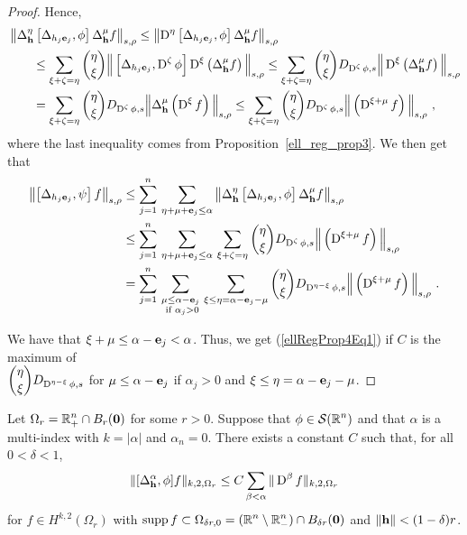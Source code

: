 \begin{proof}
Hence,
\begin{align*}
&\left\| \Delta^{\eta}_{\mathbf{h}} \left[
\Delta_{h_j \mathbf{e}_j}, \phi\right] \Delta^{\mu}_{\mathbf{h}} f \right\|_{s,\rho}
\leq \left\| \operatorname{D}^\eta \left[ \Delta_{h_j \mathbf{e}_j}, \phi\right]
\Delta^{\mu}_{\mathbf{h}} f\right\|_{s,\rho} \\
&\qquad \leq \sum_{\xi+\zeta = \eta} \binom{\eta}{\xi}
\Big\| \left[ \Delta_{h_j\mathbf{e}_j} , \operatorname{D}^\zeta \phi \right] \operatorname{D}^\xi
\left(\Delta^\mu_{\mathbf{h}} f\right) \Big\|_{s,\rho}
\leq \sum_{\xi+\zeta = \eta} \binom{\eta}{\xi}
D_{\operatorname{D}^\zeta \phi,s}
\Big\| \operatorname{D}^\xi \left(\Delta^\mu_{\mathbf{h}} f\right) \Big\|_{s,\rho} \\
&\qquad =\sum_{\xi+\zeta = \eta} \binom{\eta}{\xi} D_{\operatorname{D}^\zeta \phi,s}
\Big\| \Delta^\mu_{\mathbf{h}} \left(\operatorname{D}^\xi f\right) \Big\|_{s,\rho}
\leq \sum_{\xi+\zeta = \eta} \binom{\eta}{\xi}
D_{\operatorname{D}^\zeta \phi,s} \Big\| \left(\operatorname{D}^{\xi+\mu} f\right) \Big\|_{s,\rho} \ ,
\end{align*}
where the last inequality comes from Proposition~\ref{ell_reg_prop3}.
We then get that
\begin{align*}
\left\| \left[ \Delta_{h_j\mathbf{e}_j} ,\psi \right] f \right\|_{s,\rho}
&\leq \sum_{j=1}^n \,
\sum_{\eta+\mu+\mathbf{e}_j \leq \alpha} \left\| \Delta^{\eta}_{\mathbf{h}} \left[
\Delta_{h_j \mathbf{e}_j}, \phi\right] \Delta^{\mu}_{\mathbf{h}} f \right\|_{s,\rho} \\
&\leq \sum_{j=1}^n \,
\sum_{\eta+\mu+\mathbf{e}_j \leq \alpha} \, \sum_{\xi+\zeta = \eta} \binom{\eta}{\xi}
D_{\operatorname{D}^\zeta \phi,s} \Big\| \left(\operatorname{D}^{\xi+\mu} f\right) \Big\|_{s,\rho} \\
&= \sum_{j=1}^n \, \sum_{\substack{\mu \leq \alpha - \mathbf{e}_j \\
\text{ if } \alpha_j >0}} \, \sum_{\xi \leq \eta = \alpha - \mathbf{e}_j - \mu}
\binom{\eta}{\xi} D_{\operatorname{D}^{\eta- \xi} \phi,s}
\Big\| \left(\operatorname{D}^{\xi+\mu} f\right) \Big\|_{s,\rho} \ .
\end{align*}

We have that $\xi + \mu \leq \alpha - \mathbf{e}_j < \alpha$.  Thus, we
get (\ref{ellRegProp4Eq1}) if $C$ is the maximum of\\
$\displaystyle \binom{\eta}{\xi} D_{\operatorname{D}^{\eta - \xi} \phi,s}$ for
$\mu \leq \alpha - \mathbf{e}_j$ if $\alpha_j >0$ and
$\xi \leq \eta = \alpha - \mathbf{e}_j - \mu$.
\end{proof}

\begin{cor} \label{ell_reg_cor2}
Let $\displaystyle \Omega_r = \mathbb{R}^n_+ \cap B_r(\mathbf{0})$ for some $r>0$.
Suppose that $\displaystyle \phi \in \mathcal{S}(\mathbb{R}^n)$
and that $\alpha$ is a multi-index with $k = |\alpha|$ and
$\alpha_n=0$.  There exists a constant $C$ such that, for all $0 < \delta <1$,
\begin{equation} \label{ellRegCor2Eq1}
\| [\Delta^\alpha_{\mathbf{h}}, \phi] f \|_{k,2,\Omega_r} \leq C
\sum_{\beta<\alpha} \| \operatorname{D}^\beta f\|_{k,2,\Omega_r}
\end{equation}
for $\displaystyle f \in H^{k,2}(\Omega_r)$ with
$\displaystyle \operatorname{supp} f \subset \Omega_{\delta r,0}
= (\mathbb{R}^n \setminus \mathbb{R}^n_-) \cap B_{\delta r}(\mathbf{0})$ and
$\|\mathbf{h}\|<(1-\delta)r$.
\end{cor}

